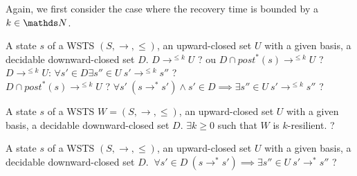 Again, we first consider the case where the recovery time is bounded by a $k \in \N$.

{A state $s$ of a WSTS $(S,\rightarrow, \leq)$, an upward-closed set $U$ with a given basis, a decidable downward-closed set $D$.}
{$D \longrightarrow^{\leq k} U$ ?  ou $D \cap post^*(s) \longrightarrow^{\leq k} U$ ?  \newline}
%
%
$D \longrightarrow^{\leq k} U$: $\forall s' \in D \exists s'' \in U ~ s' \rightarrow^{\leq k} s''$ ?\\
%
$D \cap post^*(s) \longrightarrow^{\leq k} U$ ?
%
$\forall s' ~ (s \rightarrow^* s') \wedge s' \in D  \implies \exists s'' \in U ~ s' \rightarrow^{\leq k} s''$ ?





{A state $s$ of a WSTS $W=(S,\rightarrow, \leq)$, an upward-closed set $U$ with a given basis, a decidable downward-closed set $D$.}
{$\exists k \geq 0$ such that $W$ is $k$-resilient. ?\newline}

{A state $s$ of a WSTS $(S,\rightarrow, \leq)$, an upward-closed set $U$ with a given basis, a decidable downward-closed set $D$.}
{$ ~ \forall s' \in D ~ (s \rightarrow^* s') \implies \exists s'' \in U ~ s' \rightarrow^{*} s''$ ?\newline}


